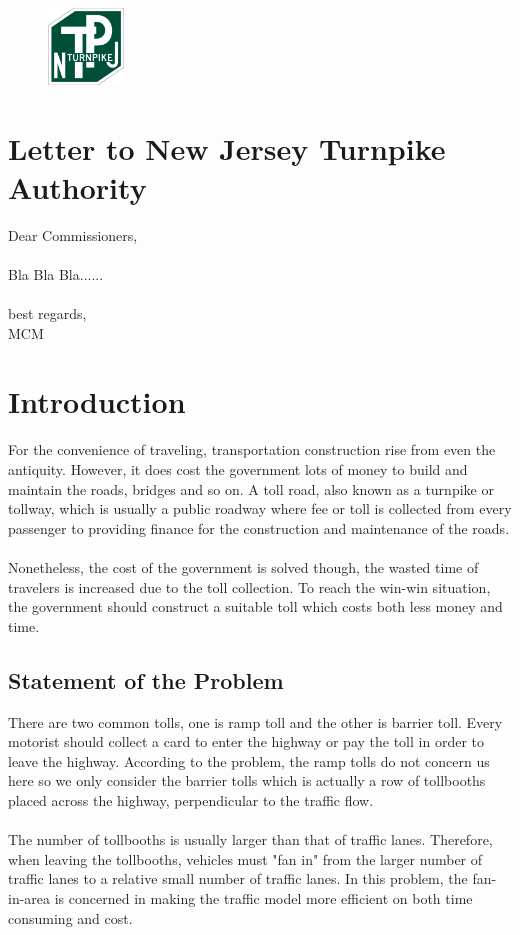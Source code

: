 \
\begin{figure}[h]
\centering
\includegraphics[width=2cm]{NJTA.png}
\end{figure}
\section{Letter to New Jersey Turnpike Authority}
Dear Commissioners,\\
\\
Bla Bla Bla......\\
\\
best regards,\\
MCM

\section{Introduction}
For the convenience of traveling, transportation construction rise from even the antiquity. However, it does cost the government lots of money to build and maintain the roads, bridges and so on. A toll road, also known as a turnpike or tollway, which is usually a public roadway where fee or toll is collected from every passenger to providing finance for the construction and maintenance of the roads.\\
\\
Nonetheless, the cost of the government is solved though, the wasted time of travelers is increased due to the toll collection. To reach the win-win situation, the government should construct a suitable toll which costs both less money and time.

\subsection{Statement of the Problem}
There are two common tolls, one is ramp toll and the other is barrier toll. Every motorist should collect a card to enter the highway or pay the toll in order to leave the highway. According to the problem, the ramp tolls do not concern us here so we only consider the barrier tolls which is actually a row of tollbooths placed across the highway, perpendicular to the traffic flow.\\
\\
The number of tollbooths is usually larger than that of traffic lanes. Therefore, when leaving the tollbooths, vehicles must "fan in" from the larger number of traffic lanes to a relative small number of traffic lanes. In this problem, the fan-in-area is concerned in making the traffic model more efficient on both time consuming and cost.

